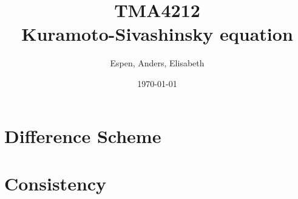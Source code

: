 \documentclass[16pt]{article}
\title{TMA4212 \\ Kuramoto-Sivashinsky equation}
\author{Espen, Anders, Elisabeth}
\date{\today}
\begin{document}
\huge

\section*{Difference Scheme}


\section*{Consistency}

\end{document}
